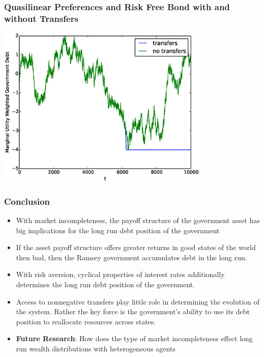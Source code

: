 \documentclass{beamer}
\begin{document}
\begin{frame}
	\frametitle{Quasilinear Preferences and Risk Free Bond  with and without Transfers}
	\begin{center}
	\includegraphics[width=4in]{Images/transfer_example2.eps}
	\end{center}
\end{frame}

 \begin{frame}
  \frametitle{Conclusion}
\begin{itemize}
	\item With market incompleteness, the payoff structure of the government asset has big implications for the long run debt position of the government
	\item If the asset payoff structure offers greater returns in good states of the world then bad, then the Ramsey government  accumulates debt in the long run.
	
\item With risk aversion, cyclical properties of interest rates additionally determines the long run debt position of the government.
	\item  Access to nonnegative transfers play little role in determining the evolution of the system.  Rather the key  force is the government's ability to use its debt position to reallocate resources across states.
	\item  \textbf{Future Research}:  How does the type of market incompleteness effect long run wealth distributions with heterogeneous agents
\end{itemize}
 \end{frame}

  
\end{document}
